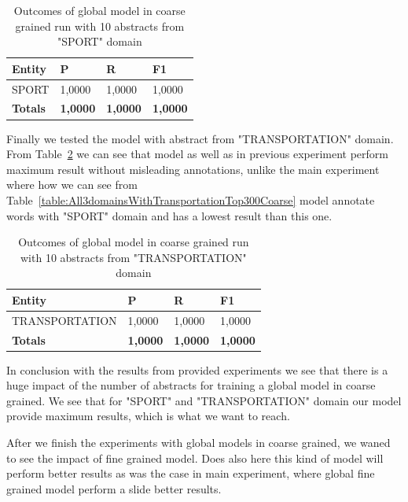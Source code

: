 \documentclass[thesis=M,english]{FITthesis}[2018/05/30]
\begin{document}
	\begin{table}[H]\centering
		\begin{tabular}{|l|l|l|l|}
			\hline {\textbf{Entity}} & {\textbf{P}} & {\textbf{R}} & {\textbf{F1}}\\\hline
				SPORT & 1,0000 & 1,0000 & 1,0000\\\hline
				\textbf{Totals} & \textbf{1,0000} & \textbf{1,0000} & \textbf{1,0000}\\\hline
		\end{tabular}
		\caption{Outcomes of global model in coarse grained run with 10 abstracts from "SPORT" domain \label{table:GlobalDomainWithSportTop10Coarse}}	
	\end{table}	

	Finally we tested the model with abstract from "TRANSPORTATION" domain. From Table~\ref{table:GlobalDomainWithTransportationTop10Coarse} we can see that model as well as in previous experiment perform maximum result without misleading annotations, unlike the main experiment where how we can see from Table~\ref{table:All3domainsWithTransportationTop300Coarse} model annotate words with "SPORT" domain and has a lowest result than this one.
	
	\begin{table}[H]\centering
		\begin{tabular}{|l|l|l|l|}
			\hline {\textbf{Entity}} & {\textbf{P}} & {\textbf{R}} & {\textbf{F1}}\\\hline
				TRANSPORTATION & 1,0000 & 1,0000 & 1,0000\\\hline
				\textbf{Totals} & \textbf{1,0000} & \textbf{1,0000} & \textbf{1,0000}\\\hline
		\end{tabular}
		\caption{Outcomes of global model in coarse grained run with 10 abstracts from "TRANSPORTATION" domain \label{table:GlobalDomainWithTransportationTop10Coarse}}	
	\end{table}

	In conclusion with the results from provided experiments we see that there is a huge impact of the number of abstracts for training a global model in coarse grained. We see that for "SPORT" and "TRANSPORTATION" domain our model provide maximum results, which is what we want to reach.


	After we finish the experiments with global models in coarse grained, we waned to see the impact of fine grained model. Does also here this kind of model will perform better results as was the case in main experiment, where global fine grained model perform a slide better results.
	
\end{document}
